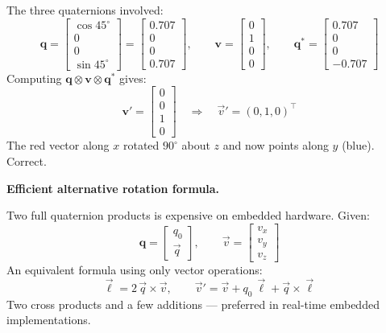 \documentclass[12pt, a4paper]{article}
\begin{document}
\begin{notebox}
  The three quaternions involved:
  \[
    \mathbf{q}
    = \begin{bmatrix} \cos 45^\circ \\ 0 \\ 0 \\ \sin 45^\circ \end{bmatrix}
    = \begin{bmatrix} 0.707 \\ 0 \\ 0 \\ 0.707 \end{bmatrix},
    \qquad
    \mathbf{v}
    = \begin{bmatrix} 0 \\ 1 \\ 0 \\ 0 \end{bmatrix},
    \qquad
    \mathbf{q}^*
    = \begin{bmatrix} 0.707 \\ 0 \\ 0 \\ -0.707 \end{bmatrix}
  \]
  Computing $\mathbf{q}\otimes\mathbf{v}\otimes\mathbf{q}^*$ gives:
  \[
    \mathbf{v}'
    = \begin{bmatrix} 0 \\ 0 \\ 1 \\ 0 \end{bmatrix}
    \quad\Longrightarrow\quad
    \vec{v}' = (0,1,0)^\top
  \]
  The red vector along $x$ rotated $90^\circ$ about $z$ and now points
  along $y$ (blue). Correct.
\end{notebox}

\textbf{Efficient alternative rotation formula.}

Two full quaternion products is expensive on embedded hardware.
Given:
\[
  \mathbf{q} = \begin{bmatrix} q_0 \\ \vec{q} \end{bmatrix}, \qquad
  \vec{v} = \begin{bmatrix} v_x \\ v_y \\ v_z \end{bmatrix}
\]
An equivalent formula using only vector operations:
\[
  \vec{\ell} = 2\,\vec{q} \times \vec{v},
  \qquad
  \vec{v}' = \vec{v} + q_0\,\vec{\ell} + \vec{q} \times \vec{\ell}
\]
Two cross products and a few additions --- preferred in real-time
embedded implementations.
\end{document}
